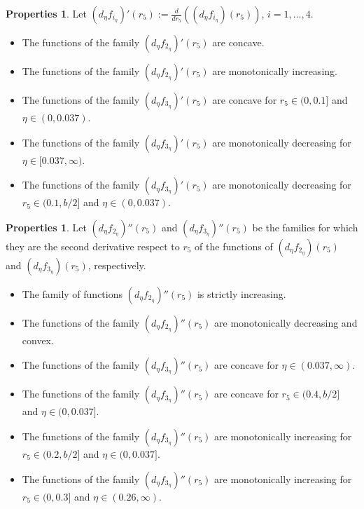 \documentclass[final,11pt]{article}
\numberwithin{equation}{section}
\theoremstyle{definition}
\newtheorem{properties}[theorem]{Properties}
\begin{document}
\begin{properties}\label{pfs} 
Let $\left(d_{\eta}f_{i_{\eta}}\right)'(r_{5}):=\frac{d}{dr_{5}}\left(\left(d_{\eta}f_{i_{\eta}}\right)(r_{5})\right)$, $i=1,...,4$.
\begin{itemize}
\item The functions of the family $(d_{\eta}f_{2_{\eta}})'(r_{5})$  are concave.
\item The functions of the family $(d_{\eta}f_{2_{\eta}})'(r_{5})$ are monotonically increasing.
\item The functions of the family $\left(d_{\eta}f_{3_{\eta}}\right)'(r_{5})$ are concave for $r_{5}\in(0,0.1]$ and $\eta\in(0,0.037)$.
\item The functions of the family $\left(d_{\eta}f_{3_{\eta}}\right)'(r_{5})$ are monotonically decreasing for $\eta\in[0.037,\infty)$.
\item The functions of the family $\left(d_{\eta}f_{3_{\eta}}\right)'(r_{5})$ are monotonically decreasing for $r_{5}\in(0.1,b/2]$ and $\eta\in(0,0.037)$.
\end{itemize}
\end{properties}

\begin{properties}\label{spfs}
Let $(d_{\eta}f_{2_{\eta}})''(r_{5})$ and $(d_{\eta}f_{3_{\eta}})''(r_{5})$ be the families for which they are the second derivative respect to $r_{5}$ of the functions of $\left(d_{\eta}f_{2_{\eta}}\right)(r_{5})$ and $\left(d_{\eta}f_{3_{\eta}}\right)(r_{5})$, respectively.

\begin{itemize}
\item The family of functions $(d_{\eta}f_{2_{\eta}})''(r_{5})$ is strictly increasing.
\item The functions of the family $(d_{\eta}f_{2_{\eta}})''(r_{5})$ are monotonically decreasing and convex.
\item The functions of the family $(d_{\eta}f_{3_{\eta}})''(r_{5})$ are concave for $\eta\in(0.037,\infty)$.
\item The functions of the family $(d_{\eta}f_{3_{\eta}})''(r_{5})$ are concave for $r_{5}\in(0.4,b/2]$ and $\eta\in(0,0.037]$.
\item The functions of the family $(d_{\eta}f_{3_{\eta}})''(r_{5})$ are monotonically increasing for $r_{5}\in(0.2,b/2]$ and $\eta\in(0,0.037]$.
\item The functions of the family $(d_{\eta}f_{3_{\eta}})''(r_{5})$ are monotonically increasing for $r_{5}\in(0,0.3]$ and $\eta\in(0.26,\infty)$.
\end{itemize}
\end{properties}
\end{document}
